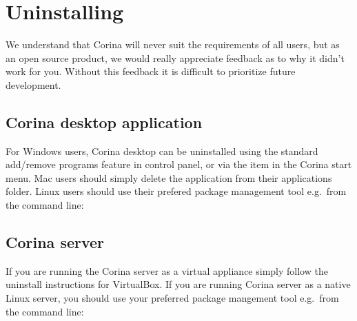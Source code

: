 \section{Uninstalling}

We understand that Corina will never suit the requirements of all users, but as an open source product, we would really appreciate feedback as to why it didn't work for you.  Without this feedback it is difficult to prioritize future development.

\subsection{Corina desktop application}
For Windows users, Corina desktop can be uninstalled using the standard add/remove programs feature in control panel, or via the item in the Corina start menu.  Mac users should simply delete the application from their applications folder.  Linux users should use their prefered package management tool e.g.\ from the command line:

\subsection{Corina server}


If you are running the Corina server as a virtual appliance simply follow the uninstall instructions for VirtualBox.  If you are running Corina server as a native Linux server, you should use your preferred package mangement tool e.g.\ from the command line:







